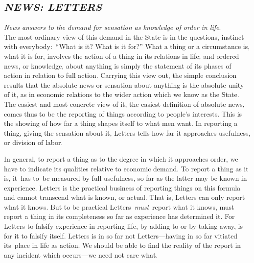 \documentclass[openany,nobib]{tufte-book}
\begin{document}
\hypertarget{news-letters}{%
\subsection{\texorpdfstring{\emph{NEWS:
LETTERS}~}{NEWS: LETTERS~}}\label{news-letters}}

\emph{News answers to the demand for sensation as knowledge of order in
life}.\\\noindent The most ordinary view of this demand in the State is in the
questions, instinct with everybody:~``What is it? What is it for?'' What
a thing or a circumstance is, what it is for, involves the action of a
thing in its relations in life; and ordered news, or knowledge, about
anything is simply the statement of its phases of action in relation to
full action. Carrying this view out, the simple conclusion results that
the absolute news or sensation about anything is the absolute unity of
it, as in economic relations to the wider action which we know as the
State. The easiest and most concrete view of it, the easiest definition
of absolute news, comes thus to be the reporting of things according to
people's interests. This is the showing of how far a thing shapes itself
to what men want. In reporting a thing, giving the sensation about it,
Letters tells how far it approaches usefulness, or division of labor.~

In general, to report a thing as to the degree in which it approaches
order, we have to indicate its qualities relative to economic demand. To
report a thing as it is, it~has to~be measured by full usefulness, so
far as the latter may be known in experience. Letters is the practical
business of reporting things on this formula and cannot transcend what
is known, or actual. That is, Letters can only report what it knows. But
to be practical Letters\emph{~must}~report what it knows, must report a
thing in its completeness so far as experience has determined it. For
Letters to falsify experience in reporting life, by adding to or by
taking away, is for it to falsify itself. Letters is in so far not
Letters---having in so far vitiated its~place in life as action. We
should be able to find the reality of the report in any incident which
occurs---we need not care what.
\end{document}
